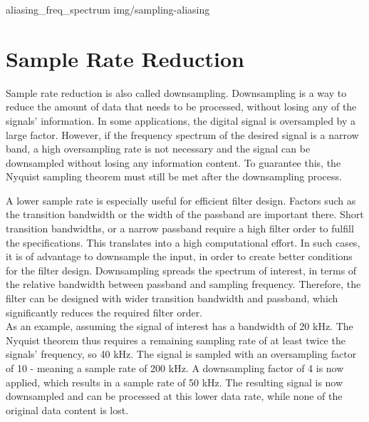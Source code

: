  {aliasing_freq_spectrum} {img/sampling-aliasing}

\section{Sample Rate Reduction}

Sample rate reduction is also called downsampling.
Downsampling is a way to reduce the amount of data that needs to be processed, without losing any of the signals' information.
In some applications, the digital signal is oversampled by a large factor.
However, if the frequency spectrum of the desired signal is a narrow band, a high oversampling rate is not necessary and the signal can be downsampled without losing any information content.
To guarantee this, the Nyquist sampling theorem must still be met after the downsampling process.

A lower sample rate is especially useful for efficient filter design.
Factors such as the transition bandwidth or the width of the passband are important there.
Short transition bandwidths, or a narrow passband require a high filter order to fulfill the specifications.
This translates into a high computational effort.
In such cases, it is of advantage to downsample the input, in order to create better conditions for the filter design.
Downsampling spreads the spectrum of interest, in terms of the relative bandwidth between passband and sampling frequency.
Therefore, the filter can be designed with wider transition bandwidth and passband, which significantly reduces the required filter order.\\

As an example, assuming the signal of interest has a bandwidth of 20 kHz.
The Nyquist theorem thus requires a remaining sampling rate of at least twice the signals' frequency, so 40 kHz.
The signal is sampled with an oversampling factor of 10 - meaning a sample rate of 200 kHz.
A downsampling factor of 4 is now applied, which results in a sample rate of 50 kHz.
The resulting signal is now downsampled and can be processed at this lower data rate, while none of the original data content is lost.\\

